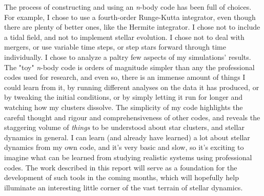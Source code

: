 \documentclass{article}
\begin{document}
The process of constructing and using an \textit{n}-body code has been full of choices. For example, I chose to use a fourth-order Runge-Kutta integrator, even though there are plenty of better ones, like the Hermite integrator. I chose not to include a tidal field, and not to implement stellar evolution. I chose not to deal with mergers, or use variable time steps, or step stars forward through time individually. I chose to analyze a paltry few aspects of my simulations' results. The "toy" \textit{n}-body code is orders of magnitude simpler than any the professional codes used for research, and even so, there is an immense amount of things I could learn from it, by running different analyses on the data it has produced, or by tweaking the initial conditions, or by simply letting it run for longer and watching how my clusters dissolve. The simplicity of my code highlights the careful thought and rigour and comprehensiveness of other codes, and reveals the staggering volume of \textit{things} to be understood about star clusters, and stellar dynamics in general. I can learn (and already have learned) a lot about stellar dynamics from my own code, and it's very basic and slow, so it's exciting to imagine what can be learned from studying realistic systems using professional codes. The work described in this report will serve as a foundation for the development of such tools in the coming months, which will hopefully help illuminate an interesting little corner of the vast terrain of stellar dynamics.



\end{document}
